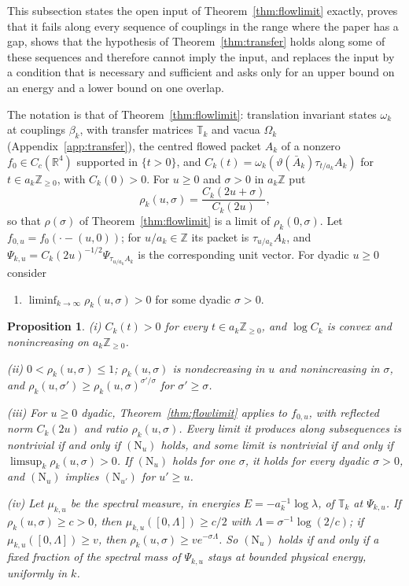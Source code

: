 \documentclass[aps,prd,twocolumn,superscriptaddress,nofootinbib,longbibliography,floatfix,amsmath,amssymb,10pt]{revtex4-2}
\newtheorem{proposition}[theorem]{Proposition}
\theoremstyle{definition}
\theoremstyle{remark}
\newcommand{\R}{\mathbb{R}}
\newcommand{\Z}{\mathbb{Z}}
\begin{document}
This subsection states the open input of Theorem~\ref{thm:flowlimit}
exactly, proves that it fails along every sequence of couplings in the range
where the paper has a gap, shows that the hypothesis of
Theorem~\ref{thm:transfer} holds along some of these sequences and therefore
cannot imply the input, and replaces the input by a condition that is
necessary and sufficient and asks only for an upper bound on an energy and a
lower bound on one overlap.

The notation is that of Theorem~\ref{thm:flowlimit}: translation invariant
states $\omega_k$ at couplings $\beta_k$, with transfer matrices $\mathbb T_k$
and vacua $\Omega_k$ (Appendix~\ref{app:transfer}), the centred flowed packet
$A_k$ of a nonzero $f_0\in C_c(\R^4)$ supported in $\{t>0\}$, and
$C_k(t)=\omega_k(\vartheta(\bar A_k)\tau_{t/a_k}A_k)$ for $t\in a_k\Z_{\ge0}$,
with $C_k(0)>0$. For $u\ge0$ and $\sigma>0$ in $a_k\Z$ put
\[
\rho_k(u,\sigma)=\frac{C_k(2u+\sigma)}{C_k(2u)} ,
\]
so that $\rho(\sigma)$ of Theorem~\ref{thm:flowlimit} is a limit of
$\rho_k(0,\sigma)$. Let $f_{0,u}=f_0(\cdot-(u,0))$; for $u/a_k\in\Z$ its packet
is $\tau_{u/a_k}A_k$, and $\Psi_{k,u}=C_k(2u)^{-1/2}\Psi_{\tau_{u/a_k}A_k}$ is
the corresponding unit vector. For dyadic $u\ge0$ consider
\begin{enumerate}[label=\textup{(N$_u$)},leftmargin=*]
\item $\liminf_{k\to\infty}\rho_k(u,\sigma)>0$ for some dyadic $\sigma>0$.
\end{enumerate}

\begin{proposition}\label{prop:ratioexact}
\textup{(i)} $C_k(t)>0$ for every $t\in a_k\Z_{\ge0}$, and $\log C_k$ is
convex and nonincreasing on $a_k\Z_{\ge0}$.

\textup{(ii)} $0<\rho_k(u,\sigma)\le1$; $\rho_k(u,\sigma)$ is nondecreasing in
$u$ and nonincreasing in $\sigma$, and
$\rho_k(u,\sigma')\ge\rho_k(u,\sigma)^{\sigma'/\sigma}$ for $\sigma'\ge\sigma$.

\textup{(iii)} For $u\ge0$ dyadic, Theorem~\ref{thm:flowlimit} applies to
$f_{0,u}$, with reflected norm $C_k(2u)$ and ratio $\rho_k(u,\sigma)$. Every
limit it produces along subsequences is nontrivial if and only if
$(\mathrm N_u)$ holds, and some limit is nontrivial if and only if
$\limsup_k\rho_k(u,\sigma)>0$. If $(\mathrm N_u)$ holds for one $\sigma$, it
holds for every dyadic $\sigma>0$, and $(\mathrm N_u)$ implies
$(\mathrm N_{u'})$ for $u'\ge u$.

\textup{(iv)} Let $\mu_{k,u}$ be the spectral measure, in energies
$E=-a_k^{-1}\log\lambda$, of $\mathbb T_k$ at $\Psi_{k,u}$. If
$\rho_k(u,\sigma)\ge c>0$, then $\mu_{k,u}([0,\Lambda])\ge c/2$ with
$\Lambda=\sigma^{-1}\log(2/c)$; if $\mu_{k,u}([0,\Lambda])\ge v$, then
$\rho_k(u,\sigma)\ge ve^{-\sigma\Lambda}$. So $(\mathrm N_u)$ holds if and only
if a fixed fraction of the spectral mass of $\Psi_{k,u}$ stays at bounded
physical energy, uniformly in $k$.
\end{proposition}
\end{document}
